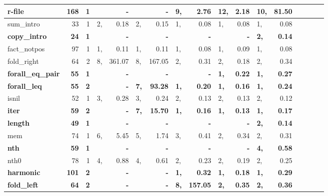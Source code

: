 \begin{table*}
\begin{center}
\begin{tabular}{|l|r|r|p{0pt}r|p{0pt}r|p{0pt}r|p{0pt}r|p{0pt}r|p{0pt}r|p{0pt}r|}
\bf r-file            & \bf   168& \bf  1& \bf     & \bf       - & \bf     & \bf       - & \bf  9, & \bf    2.76 & \bf 12, & \bf    2.18 & \bf 10, & \bf   81.50 \\
\hline
sum\_intro        &   33 & 1 &  2, &    0.18 &  2, &    0.15 &  1, &    0.08 &  1, &    0.08 &  1, &    0.08 \\
\bf copy\_intro       & \bf   24 & \bf 1 & \bf     & \bf       - & \bf     & \bf       - & \bf     & \bf       - & \bf     & \bf       - & \bf  2, & \bf    0.14 \\
fact\_notpos      &   97 & 1 &  1, &    0.11 &  1, &    0.11 &  1, &    0.08 &  1, &    0.09 &  1, &    0.08 \\
fold\_right       &   64 & 2 &  8, &  361.07 &  8, &  167.05 &  2, &    0.31 &  2, &    0.18 &  2, &    0.34 \\
\bf forall\_eq\_pair  & \bf   55 & \bf 1 & \bf     & \bf       - & \bf     & \bf       - & \bf     & \bf       - & \bf  1, & \bf    0.22 & \bf  1, & \bf    0.27 \\
\bf forall\_leq       & \bf   55 & \bf 2 & \bf     & \bf       - & \bf  7, & \bf   93.28 & \bf  1, & \bf    0.20 & \bf  1, & \bf    0.16 & \bf  1, & \bf    0.24 \\
isnil             &   52 & 1 &  3, &    0.28 &  3, &    0.24 &  2, &    0.13 &  2, &    0.13 &  2, &    0.12 \\
\bf iter              & \bf   59 & \bf 2 & \bf     & \bf       - & \bf  7, & \bf   15.70 & \bf  1, & \bf    0.16 & \bf  1, & \bf    0.13 & \bf  1, & \bf    0.17 \\
\bf length            & \bf   49 & \bf 1 & \bf     & \bf       - & \bf     & \bf       - & \bf     & \bf       - & \bf     & \bf       - & \bf  2, & \bf    0.14 \\
mem               &   74 & 1 &  6, &    5.45 &  5, &    1.74 &  3, &    0.41 &  2, &    0.34 &  2, &    0.31 \\
\bf nth               & \bf   59 & \bf 1 & \bf     & \bf       - & \bf     & \bf       - & \bf     & \bf       - & \bf     & \bf       - & \bf  4, & \bf    0.58 \\
nth0              &   78 & 1 &  4, &    0.88 &  4, &    0.61 &  2, &    0.23 &  2, &    0.19 &  2, &    0.25 \\
\bf harmonic          & \bf  101 & \bf 2 & \bf     & \bf       - & \bf     & \bf       - & \bf  1, & \bf    0.32 & \bf  1, & \bf    0.18 & \bf  1, & \bf    0.29 \\
\bf fold\_left        & \bf   64 & \bf 2 & \bf     & \bf       - & \bf     & \bf       - & \bf  8, & \bf  157.05 & \bf  2, & \bf    0.35 & \bf  2, & \bf    0.36 \\

\end{tabular}
\end{center}
\end{table*}
